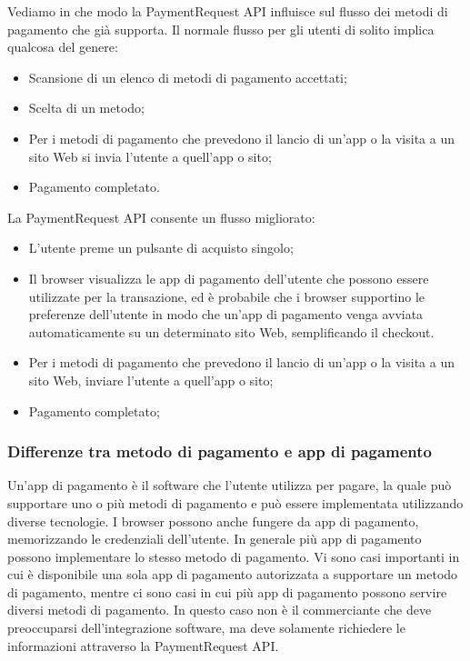\documentclass[11pt ,a4paper , twoside , openright ]{article}
\begin{document}
	Vediamo in che modo la PaymentRequest API influisce sul flusso dei metodi di pagamento che già supporta. Il normale flusso per gli utenti di solito implica qualcosa del genere:
	\begin{itemize}
	\item Scansione di un elenco di metodi di pagamento accettati;
	\item Scelta di un metodo;
	\item Per i metodi di pagamento che prevedono il lancio di un'app o la visita a un sito Web si invia l'utente a quell'app o sito;
	\item Pagamento completato.
	\end{itemize}
	La PaymentRequest API consente un flusso migliorato:
	\begin{itemize}
	\item L'utente preme un pulsante di acquisto singolo;
	\item Il browser visualizza le app di pagamento dell'utente che possono essere utilizzate per la transazione, ed è probabile che i browser supportino le preferenze dell'utente in modo che un'app di pagamento venga avviata automaticamente su un determinato sito Web, semplificando il checkout.
	\item Per i metodi di pagamento che prevedono il lancio di un'app o la visita a un sito Web, inviare l'utente a quell'app o sito; 
	\item Pagamento completato; 
	\end{itemize}
	
	
	\subsubsection{Differenze tra metodo di pagamento e app di pagamento}
	Un'app di pagamento è il software che l'utente utilizza per pagare, la quale può supportare uno o più metodi di pagamento e può essere implementata utilizzando diverse tecnologie. I browser possono anche fungere da app di pagamento, memorizzando le credenziali dell'utente. In generale più app di pagamento possono implementare lo stesso metodo di pagamento. 
	Vi sono casi importanti in cui è disponibile una sola app di pagamento autorizzata a supportare un metodo di pagamento, mentre ci sono casi in cui più app di pagamento possono servire diversi metodi di pagamento. In questo caso non è il commerciante che deve preoccuparsi dell'integrazione software, ma deve solamente richiedere le informazioni attraverso la PaymentRequest API.
	\newpage
	
\end{document}
